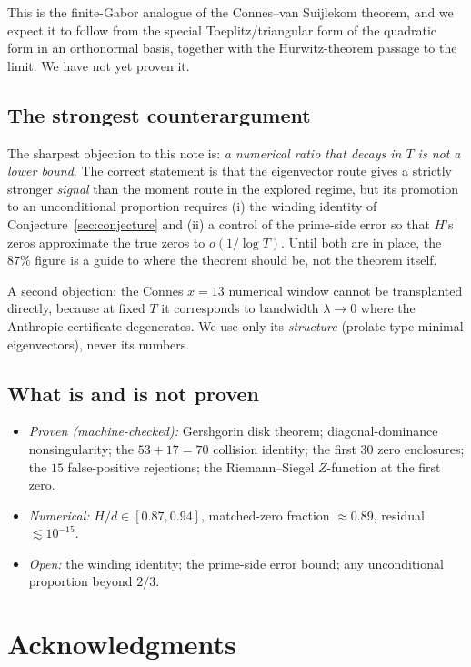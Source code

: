 \documentclass[11pt]{article}
\begin{document}
This is the finite-Gabor analogue of the Connes--van Suijlekom theorem, and we expect it to follow from the special Toeplitz/triangular form of the quadratic form in an orthonormal basis, together with the Hurwitz-theorem passage to the limit. We have not yet proven it.

\subsection{The strongest counterargument}

The sharpest objection to this note is: \emph{a numerical ratio that decays in $T$ is not a lower bound}. The correct statement is that the eigenvector route gives a strictly stronger \emph{signal} than the moment route in the explored regime, but its promotion to an unconditional proportion requires (i) the winding identity of Conjecture~\ref{sec:conjecture} and (ii) a control of the prime-side error so that $H$'s zeros approximate the true zeros to $o(1/\log T)$. Until both are in place, the $87\%$ figure is a guide to where the theorem should be, not the theorem itself.

A second objection: the Connes $x=13$ numerical window cannot be transplanted directly, because at fixed $T$ it corresponds to bandwidth $\lambda\to0$ where the Anthropic certificate degenerates. We use only its \emph{structure} (prolate-type minimal eigenvectors), never its numbers.

\subsection{What is and is not proven}

\begin{itemize}
\item \emph{Proven (machine-checked):} Gershgorin disk theorem; diagonal-dominance nonsingularity; the $53+17=70$ collision identity; the first $30$ zero enclosures; the $15$ false-positive rejections; the Riemann--Siegel $Z$-function at the first zero.
\item \emph{Numerical:} $H/d\in[0.87,0.94]$, matched-zero fraction $\approx0.89$, residual $\lesssim10^{-15}$.
\item \emph{Open:} the winding identity; the prime-side error bound; any unconditional proportion beyond $2/3$.
\end{itemize}

\section{Acknowledgments}
\end{document}
